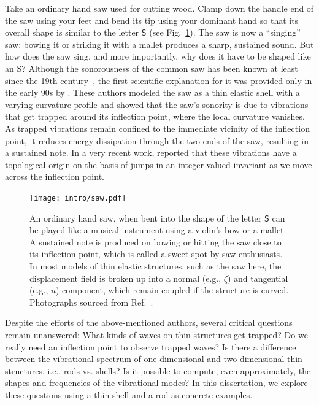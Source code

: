 Take an ordinary hand saw used for cutting wood.
Clamp down the handle end of the saw using your feet and bend its tip using your dominant hand so that its overall shape is similar to the letter $\mathsf{S}$ (see Fig.~\ref{fig:saw}).
The saw is now a ``singing'' saw: bowing it or striking it with a mallet produces a sharp, sustained sound.
But how does the saw sing, and more importantly, why does it have to be shaped like an \textsf{S}?
Although the sonorousness of the common saw has been known at least since the 19th century~\cite{stuckenbruck2016}, the first scientific explanation for it was provided only in the early 90s by \citet{scott1992}.
These authors modeled the saw as a thin elastic shell with a varying curvature profile and showed that the saw's sonority is due to vibrations that get trapped around its inflection point, where the local curvature vanishes.
As trapped vibrations remain confined to the immediate vicinity of the inflection point, it reduces energy dissipation through the two ends of the saw, resulting in a sustained note.
In a very recent work, \citet{shankar2022} reported that these vibrations have a topological origin on the basis of jumps in an integer-valued invariant as we move across the inflection point.
%
\begin{figure}
  \begin{center}
    \texttt{[image: intro/saw.pdf]}
  \end{center}
  \caption{%
    An ordinary hand saw, when bent into the shape of the letter $\mathsf{S}$ can be played like a musical instrument using a violin's bow or a mallet.
    A sustained note is produced on bowing or hitting the saw close to its inflection point, which is called a sweet spot by saw enthusiasts.
    In most models of thin elastic structures, such as the saw here, the displacement field is broken up into a normal (e.g., $\zeta$) and tangential (e.g., $u$) component, which remain coupled if the structure is curved.
    Photographs sourced from Ref.~\cite{shankar2022}.
  }
  \label{fig:saw}
\end{figure}


Despite the efforts of the above-mentioned authors, several critical questions remain unanswered:
What kinds of waves on thin structures get trapped?
Do we really need an inflection point to observe trapped waves?  Is there a difference between the vibrational spectrum of one-dimensional and two-dimensional thin structures, i.e., rods vs. shells?
Is it possible to compute, even approximately, the shapes and frequencies of the vibrational modes?
In this dissertation, we explore these questions using a thin shell and a rod as concrete examples.

